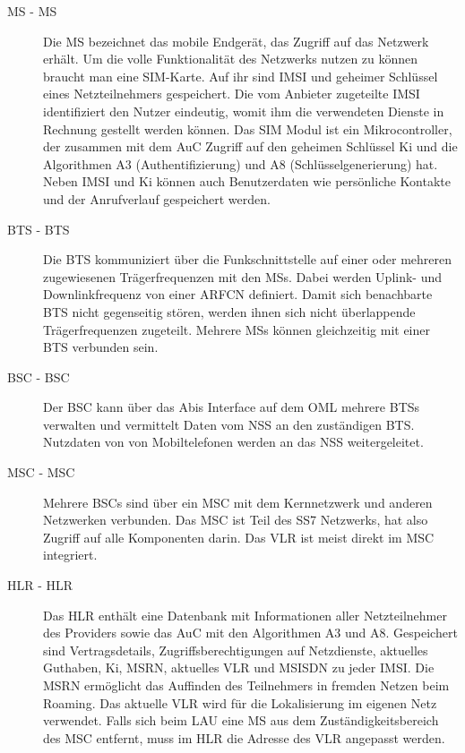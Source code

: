 \begin{description}
\item[\acs{MS} - \acl{MS}] Die \ac{MS} bezeichnet das mobile Endgerät, das Zugriff auf das Netzwerk erhält. Um die volle Funktionalität des Netzwerks nutzen zu können braucht man eine \acs{SIM}-Karte. Auf ihr sind \ac{IMSI} und geheimer Schlüssel eines Netzteilnehmers gespeichert. Die vom Anbieter zugeteilte \ac{IMSI} identifiziert den Nutzer eindeutig, womit ihm die verwendeten Dienste in Rechnung gestellt werden können. Das \ac{SIM} Modul ist ein Mikrocontroller, der zusammen mit dem \ac{AuC} Zugriff auf den geheimen Schlüssel \acs{Ki} und die Algorithmen \acs{A3} (Authentifizierung) und \acs{A8} (Schlüsselgenerierung) hat. Neben \ac{IMSI} und \acs{Ki} können auch Benutzerdaten wie persönliche Kontakte und der Anrufverlauf gespeichert werden.
\item[\acs{BTS} - \acl{BTS}] Die \ac{BTS} kommuniziert über die Funkschnittstelle auf einer oder mehreren zugewiesenen Trägerfrequenzen mit den \acp{MS}. Dabei werden Uplink- und Downlinkfrequenz von einer \ac{ARFCN} definiert. Damit sich benachbarte \ac{BTS} nicht gegenseitig stören, werden ihnen sich nicht überlappende Trägerfrequenzen zugeteilt. Mehrere \acp{MS} können gleichzeitig mit einer \ac{BTS} verbunden sein. 
\item[\acs{BSC} - \acl{BSC}] Der \ac{BSC} kann über das Abis Interface auf dem \ac{OML} mehrere \acp{BTS} verwalten und vermittelt Daten vom \ac{NSS} an den zuständigen \ac{BTS}. Nutzdaten von von Mobiltelefonen werden an das \ac{NSS} weitergeleitet.
\item[\acs{MSC} - \acl{MSC}] Mehrere \acp{BSC} sind über ein \ac{MSC} mit dem Kernnetzwerk und anderen Netzwerken verbunden. Das \ac{MSC} ist Teil des \ac{SS7} Netzwerks, hat also Zugriff auf alle Komponenten darin. Das \ac{VLR} ist meist direkt im \ac{MSC} integriert.
\item[\acs{HLR} - \acl{HLR}] Das \ac{HLR} enthält eine Datenbank mit Informationen aller Netzteilnehmer des Providers sowie das \ac{AuC} mit den Algorithmen \ac{A3} und \ac{A8}. Gespeichert sind Vertragsdetails, Zugriffsberechtigungen auf Netzdienste, aktuelles Guthaben, \acs{Ki}, \ac{MSRN}, aktuelles \ac{VLR} und \ac{MSISDN} zu jeder \ac{IMSI}. Die \ac{MSRN} ermöglicht das Auffinden des Teilnehmers in fremden Netzen beim Roaming. Das aktuelle \ac{VLR} wird für die Lokalisierung im eigenen Netz verwendet. Falls sich beim \ac{LAU} eine \ac{MS} aus dem Zuständigkeitsbereich des \ac{MSC} entfernt, muss im \ac{HLR} die Adresse des \ac{VLR} angepasst werden.

\end{description}
